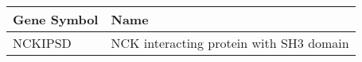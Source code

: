 \begin{tabular}{ll}
\toprule
Gene Symbol &                                    Name \\
\midrule
    NCKIPSD & NCK interacting protein with SH3 domain \\
\bottomrule
\end{tabular}
